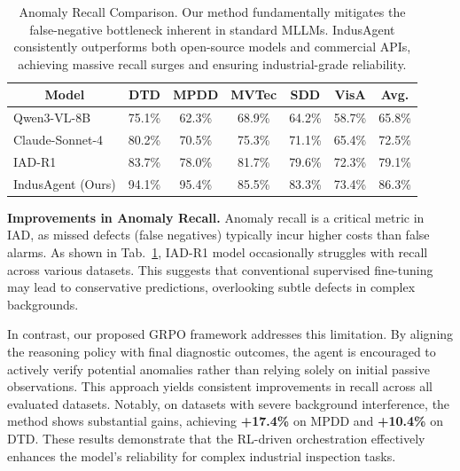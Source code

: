 \documentclass{article}
\begin{document}
\begin{table}[t]
\centering
\caption{Anomaly Recall Comparison. Our method fundamentally mitigates the false-negative bottleneck inherent in standard MLLMs. IndusAgent consistently outperforms both open-source models and commercial APIs, achieving massive recall surges and ensuring industrial-grade reliability.}
\label{tab:anomaly_recall}
\setlength{\tabcolsep}{8pt} 
\small %
\begin{tabular}{l|ccccc|c}
\toprule
\multicolumn{1}{c|}{Model} & \multicolumn{1}{c}{DTD} & \multicolumn{1}{c}{MPDD} & \multicolumn{1}{c}{MVTec} & \multicolumn{1}{c}{SDD} & \multicolumn{1}{c|}{VisA} & \multicolumn{1}{c}{Avg.} \\
\midrule
Qwen3-VL-8B & 75.1\% & 62.3\% & 68.9\% & 64.2\% & 58.7\% & 65.8\% \\
Claude-Sonnet-4 & 80.2\% & 70.5\% & 75.3\% & 71.1\% & 65.4\% & 72.5\% \\
IAD-R1 &  \cellcolor{best}83.7\% &  \cellcolor{best}78.0\% &  \cellcolor{best}81.7\% &  \cellcolor{best}79.6\% &  \cellcolor{best}72.3\% &  \cellcolor{best}79.1\% \\
\midrule
IndusAgent (Ours) & \cellcolor{best2}94.1\% & \cellcolor{best2}95.4\% &\cellcolor{best2} 85.5\% & \cellcolor{best2}83.3\% & \cellcolor{best2}73.4\% & \cellcolor{best2}86.3\% \\
\bottomrule
\end{tabular}
\vspace{-1.0em}
\end{table}


\textbf{Improvements in Anomaly Recall.} 
Anomaly recall is a critical metric in IAD, as missed defects (false negatives) typically incur higher costs than false alarms. As shown in Tab.~\ref{tab:anomaly_recall}, IAD-R1 model occasionally struggles with recall across various datasets. This suggests that conventional supervised fine-tuning may lead to conservative predictions, overlooking subtle defects in complex backgrounds. 

In contrast, our proposed GRPO framework addresses this limitation. By aligning the reasoning policy with final diagnostic outcomes, the agent is encouraged to actively verify potential anomalies rather than relying solely on initial passive observations. This approach yields consistent improvements in recall across all evaluated datasets. Notably, on datasets with severe background interference, the method shows substantial gains, achieving \textbf{+17.4\%} on MPDD and \textbf{+10.4\%} on DTD. These results demonstrate that the RL-driven orchestration effectively enhances the model's reliability for complex industrial inspection tasks.
\end{document}
